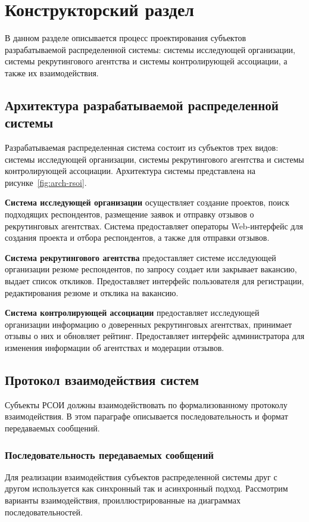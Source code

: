 \chapter{Конструкторский раздел}
\label{cha:design}

В данном разделе описывается процесс проектирования субъектов разрабатываемой распределенной системы: системы исследующей организации, системы рекрутингового агентства и системы контролирующей ассоциации, а также их взаимодействия.

\section{Архитектура разрабатываемой распределенной системы}

Разрабатываемая распределенная система состоит из субъектов трех видов: системы исследующей организации, системы рекрутингового агентства и системы контролирующей ассоциации. Архитектура системы представлена на рисунке~\ref{fig:arch-rsoi}.


\textbf{Система исследующей организации} осуществляет создание проектов, поиск подходящих респондентов, размещение заявок и отправку отзывов о рекрутинговых агентствах. Система предоставляет операторы Web-интерфейс для создания проекта и отбора респондентов, а также для отправки отзывов. 

\textbf{Система рекрутингового агентства} предоставляет системе исследующей организации резюме респондентов, по запросу создает или закрывает вакансию, выдает список откликов. Предоставляет интерфейс пользователя для регистрации, редактирования резюме и отклика на вакансию. 

\textbf{Система контролирующей ассоциации} предоставляет исследующей организации информацию о доверенных рекрутинговых агентствах, принимает отзывы о них и обновляет рейтинг. Предоставляет интерфейс администратора для изменения информации об агентствах и модерации отзывов.

\section{Протокол взаимодействия систем} 
Субъекты РСОИ должны взаимодействовать по формализованному протоколу взаимодействия. В этом параграфе описывается последовательность и формат передаваемых сообщений. 

\subsection{Последовательность передаваемых сообщений}
Для реализации взаимодействия субъектов распределенной системы друг с другом используется как синхронный так и асинхронный подход. Рассмотрим варианты взаимодействия, проиллюстрированные на диаграммах последовательностей.

